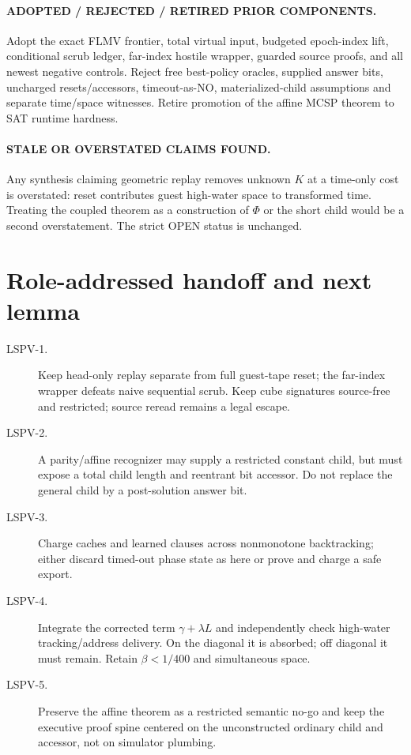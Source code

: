 \documentclass[11pt]{article}
\begin{document}
\paragraph{ADOPTED / REJECTED / RETIRED PRIOR COMPONENTS.}
Adopt the exact FLMV frontier, total virtual input, budgeted epoch-index lift,
conditional scrub ledger, far-index hostile wrapper, guarded source proofs, and
all newest negative controls.
Reject free best-policy oracles, supplied answer bits, uncharged resets/accessors,
timeout-as-NO, materialized-child assumptions and separate time/space witnesses.
Retire promotion of the affine MCSP theorem to SAT runtime hardness.

\paragraph{STALE OR OVERSTATED CLAIMS FOUND.}
Any synthesis claiming geometric replay removes unknown $K$ at a time-only cost
is overstated: reset contributes guest high-water space to transformed time.
Treating the coupled theorem as a construction of $\Phi$ or the short child would
be a second overstatement.  The strict OPEN status is unchanged.

\section{Role-addressed handoff and next lemma}
\begin{description}
\item[LSPV-1.] Keep head-only replay separate from full guest-tape reset; the
far-index wrapper defeats naive sequential scrub.  Keep cube signatures source-free and
restricted; source reread remains a legal escape.
\item[LSPV-2.] A parity/affine recognizer may supply a restricted constant child,
but must expose a total child length and reentrant bit accessor.  Do not replace
the general child by a post-solution answer bit.
\item[LSPV-3.] Charge caches and learned clauses across nonmonotone backtracking;
either discard timed-out phase state as here or prove and charge a safe export.
\item[LSPV-4.] Integrate the corrected term $\gamma+\lambda L$ and independently
check high-water tracking/address delivery.  On the diagonal it is absorbed;
off diagonal it must remain.  Retain $\beta<1/400$ and simultaneous space.
\item[LSPV-5.] Preserve the affine theorem as a restricted semantic no-go and
keep the executive proof spine centered on the unconstructed ordinary child and
accessor, not on simulator plumbing.
\end{description}
\end{document}
